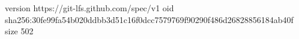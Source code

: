 version https://git-lfs.github.com/spec/v1
oid sha256:30fe99fa54b020ddbb3d51c16f0dcc7579769f90290f486d26828856184ab40f
size 502
